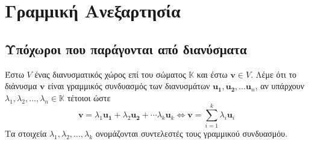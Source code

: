 



\let\vec\mathbf
\DeclareMathOperator{\Span}{span}

\pagestyle{vangelis}




\chapter{Γραμμική Ανεξαρτησία}

\section{Υπόχωροι που παράγονται από διανύσματα}

\begin{dfn}
  Έστω $ V $ ένας διανυσματικός χώρος επί του σώματος $ \mathbb{K} $ και έστω 
  $ \mathbf{v} \in V $. Λέμε ότι το διάνυσμα $ \mathbf{v}$ είναι 
  \textcolor{Col2}{γραμμικός συνδυασμός} των διανυσμάτων 
  $ \mathbf{u_{1}}, \mathbf{u_{2}}, \ldots \mathbf{u}_{n} $, αν υπάρχουν 
  $ \lambda _{1}, \lambda _{2}, \ldots, \lambda _{n} \in \mathbb{K} $ τέτοιοι ώστε 
  \[
    \mathbf{v} = \lambda _{1} \mathbf{u_{1}}+ \lambda_{2} \mathbf{u_{2}}+ 
    \cdots \lambda _{k} \mathbf{u}_{k} \Leftrightarrow \mathbf{v} = 
    \sum_{i=1}^{k} \lambda _{i} \mathbf{u}_{i} 
  \]
  Τα στοιχεία $ \lambda _{1}, \lambda _{2}, \ldots, \lambda _{k} $ ονομάζονται 
  \textcolor{Col2}{συντελεστές} τους γραμμικού συνδυασμόυ.
\end{dfn}

